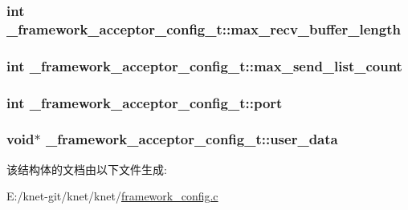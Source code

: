 \subsubsection[{max\+\_\+recv\+\_\+buffer\+\_\+length}]{\setlength{\rightskip}{0pt plus 5cm}int \+\_\+framework\+\_\+acceptor\+\_\+config\+\_\+t\+::max\+\_\+recv\+\_\+buffer\+\_\+length}\label{a00009_a74d3ca42b906826b9acc1b031b6b4510_a74d3ca42b906826b9acc1b031b6b4510}
\hypertarget{a00009_a7e11f475833e8b10f232ce7d9e0f6589_a7e11f475833e8b10f232ce7d9e0f6589}{}
\subsubsection[{max\+\_\+send\+\_\+list\+\_\+count}]{\setlength{\rightskip}{0pt plus 5cm}int \+\_\+framework\+\_\+acceptor\+\_\+config\+\_\+t\+::max\+\_\+send\+\_\+list\+\_\+count}\label{a00009_a7e11f475833e8b10f232ce7d9e0f6589_a7e11f475833e8b10f232ce7d9e0f6589}
\hypertarget{a00009_a3f5aeae2ed8ad6ecb4e319b49c40d410_a3f5aeae2ed8ad6ecb4e319b49c40d410}{}
\subsubsection[{port}]{\setlength{\rightskip}{0pt plus 5cm}int \+\_\+framework\+\_\+acceptor\+\_\+config\+\_\+t\+::port}\label{a00009_a3f5aeae2ed8ad6ecb4e319b49c40d410_a3f5aeae2ed8ad6ecb4e319b49c40d410}
\hypertarget{a00009_a844c508a5783d198b7c140c6f5e30706_a844c508a5783d198b7c140c6f5e30706}{}
\subsubsection[{user\+\_\+data}]{\setlength{\rightskip}{0pt plus 5cm}void$\ast$ \+\_\+framework\+\_\+acceptor\+\_\+config\+\_\+t\+::user\+\_\+data}\label{a00009_a844c508a5783d198b7c140c6f5e30706_a844c508a5783d198b7c140c6f5e30706}


该结构体的文档由以下文件生成\+:\begin{DoxyCompactItemize}
\item 
E\+:/knet-\/git/knet/knet/\hyperlink{a00070}{framework\+\_\+config.\+c}\end{DoxyCompactItemize}
